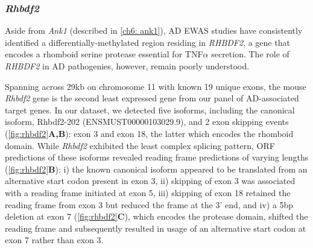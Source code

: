 \newpage
\subsubsection{\textit{Rhbdf2}}
Aside from \textit{Ank1} (described in \cref{ch6: ank1}), AD EWAS studies have consistently identified a differentially-methylated region residing in \textit{RHBDF2}, a gene that encodes a rhomboid serine protease essential for  TNF$\alpha$ secretion. The role of \textit{RHBDF2} in AD pathogenies, however, remain poorly understood.   

Spanning across 29kb on chromosome 11 with known 19 unique exons, the mouse \textit{Rhbdf2} gene is the second least expressed gene from our panel of AD-associated target genes. In our dataset, we detected five isoforms, including the canonical isoform, Rhbdf2-202 (ENSMUST00000103029.9), and 2 exon skipping events (\cref{fig:rhbdf2}\textbf{A,B}): exon 3 and exon 18, the latter which encodes the rhomboid domain. While \textit{Rhbdf2} exhibited the least complex splicing pattern, ORF predictions of these isoforms revealed reading frame predictions of varying lengths (\cref{fig:rhbdf2}\textbf{B}): i) the known canonical isoform appeared to be translated from an alternative start codon present in exon 3, ii) skipping of exon 3 was associated with a reading frame initiated at exon 5, iii) skipping of exon 18 retained the reading frame from exon 3 but reduced the frame at the 3' end, and iv) a 5bp deletion at exon 7 (\cref{fig:rhbdf2}\textbf{C}), which encodes the protease domain, shifted the reading frame and subsequently resulted in usage of an alternative start codon at exon 7 rather than exon 3.  


